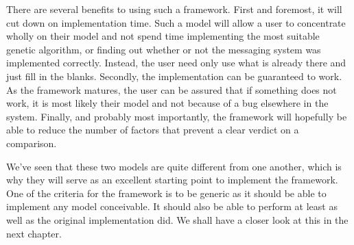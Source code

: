 There are several benefits to using such a framework. First and foremost, it will cut down on implementation time. Such a model will allow a user to concentrate wholly on their model and not spend time implementing the most suitable genetic algorithm, or finding out whether or not the messaging system was implemented correctly. Instead, the user need only use what is already there and just fill in the blanks. Secondly, the implementation can be guaranteed to work. As the framework matures, the user can be assured that if something does not work, it is most likely their model and not because of a bug elsewhere in the system. Finally, and probably most importantly, the framework will hopefully be able to reduce the number of factors that prevent a clear verdict on a comparison.

We've seen that these two models are quite different from one another, which is why they will serve as an excellent starting point to implement the framework. One of the criteria for the framework is to be generic as it should be able to implement any model conceivable. It should also be able to perform at least as well as the original implementation did. We shall have a closer look at this in the next chapter.
